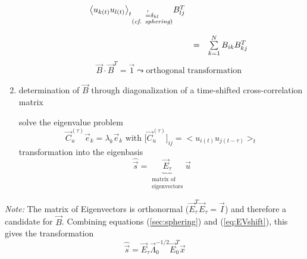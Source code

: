 \begin{enumerate}[(1)]
\begin{itemize}
\begin{equation}
\begin{array}{lcl}
{			\big< u_{k (t)} u_{l (t)} \big>_t }_{
				\substack{ \stackrel{\mathrm{!}}{=} \delta_{kl} \\
					\text{({\it cf. sphering})}} } 
			B_{lj}^T \\\\
		& = & \sum\limits_{k = 1}^N B_{ik} B_{kj}^T
		\end{array}
	\end{equation}
	\begin{equation}
		\vec{B} \cdot \vec{B}^T = \vec{1} \leadsto
		\text{orthogonal transformation}
	\end{equation}
\end{itemize}
\item determination of $\vec{B}$ through diagonalization of a time-shifted cross-correlation matrix
\begin{itemize}
	\itl solve the eigenvalue problem
	\begin{equation}
		\vec{C}_u^{(\tau)} \vec{e}_k = \lambda_k \vec{e}_k 
		\text{ with } \Big[ \vec{C}_u^{(\tau)} \Big]_{ij}
		= \Big< u_{i(t)} u_{j(t-\tau)} \Big>_t
	\end{equation}
	\itl transformation into the eigenbasis
	\begin{equation}\label{eq:EVshift}
		\widehat{\vec{s}} = \underbrace{\vec{E}_{  \tau }}_{
			\substack{ \text{matrix of} \\ \text{eigenvectors}} }
			\vec{u}
	\end{equation}
\end{itemize}
\end{enumerate}
\emph{Note:} The matrix of Eigenvectors is orthonormal
($\vec{E}^T_\tau\vec{E}_\tau=\vec{I}$) and therefore a candidate for $\vec{B}$. Combining equations (\ref{sec:sphering}) and (\ref{eq:EVshift}), this gives the transformation 
\begin{equation}
  \label{eq:2ndOrder}
\widehat{\vec{s}} = \vec{E}_\tau \vec{\Lambda}^{-1/2}_0 \vec{E}_0^T \vec{x}
\end{equation}

